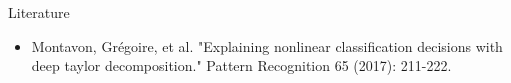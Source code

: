 \documentclass{beamer}
\begin{document}
\begin{frame}{Literature}

\begin{itemize}
	\item Montavon, Grégoire, et al. "Explaining nonlinear classification decisions with deep taylor decomposition." Pattern Recognition 65 (2017): 211-222.
\end{itemize}

\end{frame}
\end{document}
